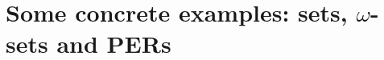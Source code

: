 \section{\texorpdfstring{Some concrete examples: sets, \(\omega\)-sets and PERs}{Some concrete examples}}
